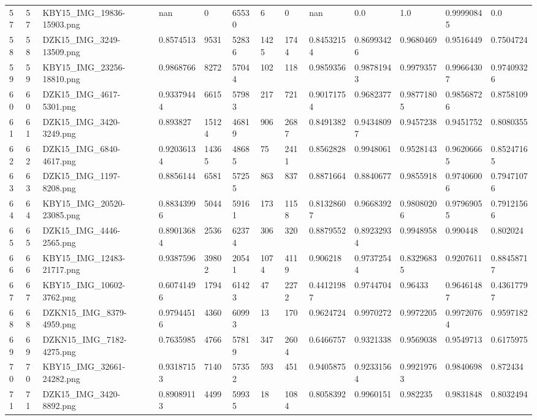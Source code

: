 \documentclass[11pt, a4paper, twoside]{report}
\begin{document}
\begin{longtable}[c]{@{}lllllllllllll@{}}
57 & 57 & KBY15\_IMG\_19836-15903.png & nan & 0 & 65530 & 6 & 0 & nan & 0.0 & 1.0 & 0.99990845 & 0.0 \\
58 & 58 & DZK15\_IMG\_3249-13509.png & 0.8574513 & 9531 & 52836 & 1425 & 1744 & 0.84532154 & 0.86993426 & 0.9680469 & 0.9516449 & 0.7504724 \\
59 & 59 & KBY15\_IMG\_23256-18810.png & 0.9868766 & 8272 & 57044 & 102 & 118 & 0.9859356 & 0.98781943 & 0.9979357 & 0.99664307 & 0.97409326 \\
60 & 60 & DZK15\_IMG\_4617-5301.png & 0.93379444 & 6615 & 57983 & 217 & 721 & 0.90171754 & 0.9682377 & 0.98771805 & 0.98568726 & 0.8758109 \\
61 & 61 & DZK15\_IMG\_3420-3249.png & 0.893827 & 15124 & 46819 & 906 & 2687 & 0.8491382 & 0.94348097 & 0.9457238 & 0.9451752 & 0.8080355 \\
62 & 62 & DZK15\_IMG\_6840-4617.png & 0.92036134 & 14365 & 48685 & 75 & 2411 & 0.8562828 & 0.9948061 & 0.9528143 & 0.96206665 & 0.85247165 \\
63 & 63 & DZK15\_IMG\_1197-8208.png & 0.8856144 & 6581 & 57255 & 863 & 837 & 0.8871664 & 0.8840677 & 0.9855918 & 0.97406006 & 0.79471076 \\
64 & 64 & KBY15\_IMG\_20520-23085.png & 0.88343996 & 5044 & 59161 & 173 & 1158 & 0.81328607 & 0.9668392 & 0.98080206 & 0.97969055 & 0.79121566 \\
65 & 65 & DZK15\_IMG\_4446-2565.png & 0.89013684 & 2536 & 62374 & 306 & 320 & 0.8879552 & 0.89232934 & 0.9948958 & 0.990448 & 0.802024 \\
66 & 66 & KBY15\_IMG\_12483-21717.png & 0.9387596 & 39802 & 20541 & 1074 & 4119 & 0.906218 & 0.97372544 & 0.83296835 & 0.9207611 & 0.88458717 \\
67 & 67 & KBY15\_IMG\_10602-3762.png & 0.60741496 & 1794 & 61423 & 47 & 2272 & 0.44121987 & 0.9744704 & 0.96433 & 0.96461487 & 0.43617797 \\
68 & 68 & DZKN15\_IMG\_8379-4959.png & 0.97944516 & 4360 & 60993 & 13 & 170 & 0.9624724 & 0.9970272 & 0.9972205 & 0.99720764 & 0.9597182 \\
69 & 69 & DZKN15\_IMG\_7182-4275.png & 0.7635985 & 4766 & 57819 & 347 & 2604 & 0.6466757 & 0.9321338 & 0.9569038 & 0.9549713 & 0.6175975 \\
70 & 70 & KBY15\_IMG\_32661-24282.png & 0.93187153 & 7140 & 57352 & 593 & 451 & 0.9405875 & 0.92331564 & 0.99219763 & 0.9840698 & 0.872434 \\
71 & 71 & DZK15\_IMG\_3420-8892.png & 0.89089113 & 4499 & 59935 & 18 & 1084 & 0.8058392 & 0.9960151 & 0.982235 & 0.9831848 & 0.8032494 \\

\end{longtable}
\end{document}
